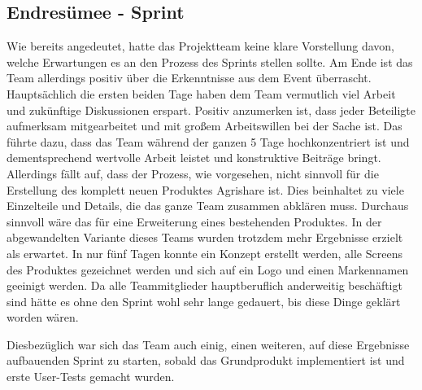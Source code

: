 \subsection*{Endresümee - Sprint}
Wie bereits angedeutet, hatte das Projektteam keine klare Vorstellung davon, welche Erwartungen es an den Prozess des Sprints stellen sollte. Am Ende ist das Team allerdings positiv über die Erkenntnisse aus dem Event überrascht. Hauptsächlich die ersten beiden Tage haben dem Team vermutlich viel Arbeit und zukünftige Diskussionen erspart. Positiv anzumerken ist, dass jeder Beteiligte aufmerksam mitgearbeitet und mit großem Arbeitswillen bei der Sache ist. Das führte dazu, dass das Team während der ganzen 5 Tage hochkonzentriert ist und dementsprechend wertvolle Arbeit leistet und konstruktive Beiträge bringt. Allerdings fällt auf, dass der Prozess, wie vorgesehen, nicht sinnvoll für die Erstellung des komplett neuen Produktes Agrishare ist. Dies beinhaltet zu viele Einzelteile und Details, die das ganze Team zusammen abklären muss. Durchaus sinnvoll wäre das für eine Erweiterung eines bestehenden Produktes. In der abgewandelten Variante dieses Teams wurden trotzdem mehr Ergebnisse erzielt als erwartet. In nur fünf Tagen konnte ein Konzept erstellt werden, alle Screens des Produktes gezeichnet werden und sich auf ein Logo und einen Markennamen geeinigt werden. Da alle Teammitglieder hauptberuflich anderweitig beschäftigt sind hätte es ohne den Sprint wohl sehr lange gedauert, bis diese Dinge geklärt worden wären.

Diesbezüglich war sich das Team auch einig, einen weiteren, auf diese Ergebnisse aufbauenden Sprint zu starten, sobald das Grundprodukt implementiert ist und erste User-Tests gemacht wurden.
